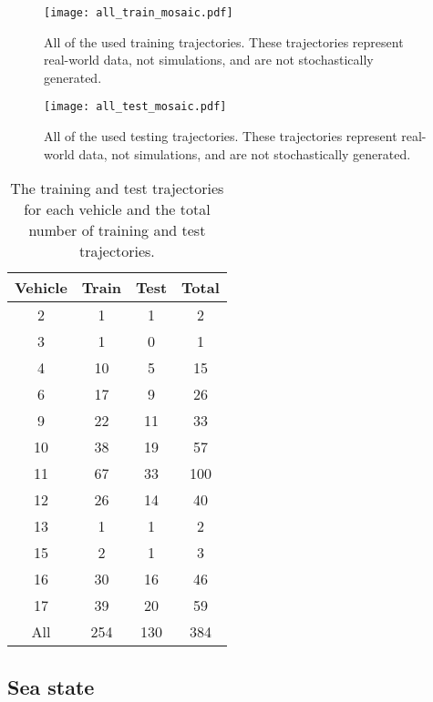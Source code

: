 \documentclass[preprint,12pt]{elsarticle}
\begin{document}
\begin{figure}[!ht]
    \centering
    \texttt{[image: all\_train\_mosaic.pdf]}
    \caption{All of the used training trajectories. These trajectories represent real-world data, not simulations, and are not stochastically generated.}
    \label{fig:all_train_mosaic}
\end{figure}

\begin{figure}[!ht]
    \centering
    \texttt{[image: all\_test\_mosaic.pdf]}
    \caption{All of the used testing trajectories. These trajectories represent real-world data, not simulations, and are not stochastically generated.}
    \label{fig:all_test_mosaic}
\end{figure}
 
\begin{table}[!ht]
    \centering
    \begin{tabular}{|c|c|c|c|}
       \hline
        Vehicle & Train & Test & Total \\ \hline
        2 & 1 & 1 & 2 \\ \hline
        3 & 1 & 0 & 1 \\ \hline
        4 & 10 & 5 & 15 \\ \hline
        6 & 17 & 9 & 26 \\ \hline
        9 & 22 & 11 & 33 \\ \hline
        10 & 38 & 19 & 57 \\ \hline
        11 & 67 & 33 & 100 \\ \hline
        12 & 26 & 14 & 40 \\ \hline
        13 & 1 & 1 & 2 \\ \hline
        15 & 2 & 1 & 3 \\ \hline
        16 & 30 & 16 & 46 \\ \hline
        17 & 39 & 20 & 59 \\ \hline
        All & 254 & 130 & 384 \\ \hline
    \end{tabular}
    \caption{The training and test trajectories for each vehicle and the total number of training and test trajectories.}
    \label{tab:testtrain}
\end{table}

\subsection{Sea state}
\end{document}
